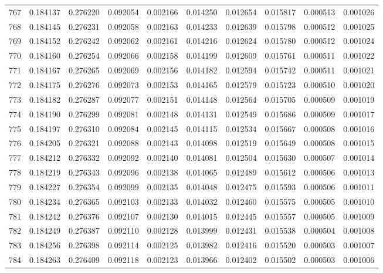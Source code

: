 \begin{tabular}{lrrrrrrrrr}
767 & 0.184137 & 0.276220 & 0.092054 & 0.002166 & 0.014250 & 0.012654 & 0.015817 & 0.000513 & 0.001026 \\
768 & 0.184145 & 0.276231 & 0.092058 & 0.002163 & 0.014233 & 0.012639 & 0.015798 & 0.000512 & 0.001025 \\
769 & 0.184152 & 0.276242 & 0.092062 & 0.002161 & 0.014216 & 0.012624 & 0.015780 & 0.000512 & 0.001024 \\
770 & 0.184160 & 0.276254 & 0.092066 & 0.002158 & 0.014199 & 0.012609 & 0.015761 & 0.000511 & 0.001022 \\
771 & 0.184167 & 0.276265 & 0.092069 & 0.002156 & 0.014182 & 0.012594 & 0.015742 & 0.000511 & 0.001021 \\
772 & 0.184175 & 0.276276 & 0.092073 & 0.002153 & 0.014165 & 0.012579 & 0.015723 & 0.000510 & 0.001020 \\
773 & 0.184182 & 0.276287 & 0.092077 & 0.002151 & 0.014148 & 0.012564 & 0.015705 & 0.000509 & 0.001019 \\
774 & 0.184190 & 0.276299 & 0.092081 & 0.002148 & 0.014131 & 0.012549 & 0.015686 & 0.000509 & 0.001017 \\
775 & 0.184197 & 0.276310 & 0.092084 & 0.002145 & 0.014115 & 0.012534 & 0.015667 & 0.000508 & 0.001016 \\
776 & 0.184205 & 0.276321 & 0.092088 & 0.002143 & 0.014098 & 0.012519 & 0.015649 & 0.000508 & 0.001015 \\
777 & 0.184212 & 0.276332 & 0.092092 & 0.002140 & 0.014081 & 0.012504 & 0.015630 & 0.000507 & 0.001014 \\
778 & 0.184219 & 0.276343 & 0.092096 & 0.002138 & 0.014065 & 0.012489 & 0.015612 & 0.000506 & 0.001013 \\
779 & 0.184227 & 0.276354 & 0.092099 & 0.002135 & 0.014048 & 0.012475 & 0.015593 & 0.000506 & 0.001011 \\
780 & 0.184234 & 0.276365 & 0.092103 & 0.002133 & 0.014032 & 0.012460 & 0.015575 & 0.000505 & 0.001010 \\
781 & 0.184242 & 0.276376 & 0.092107 & 0.002130 & 0.014015 & 0.012445 & 0.015557 & 0.000505 & 0.001009 \\
782 & 0.184249 & 0.276387 & 0.092110 & 0.002128 & 0.013999 & 0.012431 & 0.015538 & 0.000504 & 0.001008 \\
783 & 0.184256 & 0.276398 & 0.092114 & 0.002125 & 0.013982 & 0.012416 & 0.015520 & 0.000503 & 0.001007 \\
784 & 0.184263 & 0.276409 & 0.092118 & 0.002123 & 0.013966 & 0.012402 & 0.015502 & 0.000503 & 0.001006 \\

\end{tabular}
